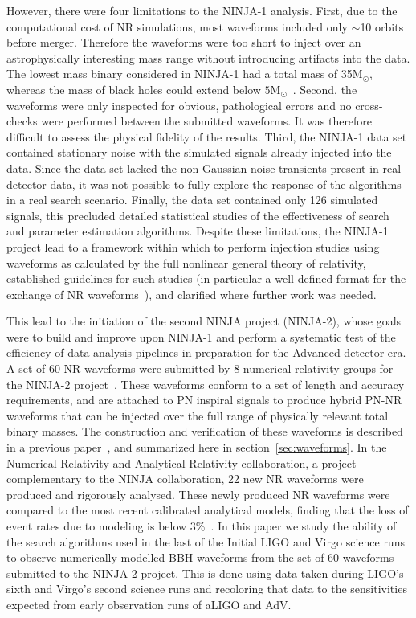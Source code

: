 \documentclass[12pt]{iopart}
\newcommand{\Ms}{\ensuremath{\mathrm{M}_{\odot}}}
\begin{document}
However, there were four limitations to
the NINJA-1 analysis. First, due to the computational cost of NR simulations, 
most waveforms 
included only $\sim$10 orbits before merger. Therefore the waveforms were 
too short to inject over an astrophysically
interesting mass range without introducing artifacts into the data. The lowest
mass binary considered in NINJA-1 had a total mass of 35$\Ms$, whereas
the mass of black holes could extend below
$5\Ms$~\cite{Farr:2010tu,Ozel:2010su}.
Second, the waveforms were only inspected for obvious,
pathological errors and no cross-checks were performed between the
submitted waveforms. It was therefore difficult to assess the
physical fidelity of the results.  
Third, the NINJA-1 data set
contained stationary noise with the simulated signals already injected
into the data. Since the data set lacked the non-Gaussian noise transients 
present 
in real detector data, it was not possible to fully explore the response of the
algorithms in a real search scenario. Finally, the data set contained only 126 
simulated signals,
this precluded detailed statistical studies of the effectiveness of
search and parameter estimation algorithms. Despite these limitations,
the NINJA-1 project lead to a framework within which to perform injection 
studies using waveforms as calculated by the full nonlinear general theory of 
relativity, established guidelines for such studies (in particular a 
well-defined format
for the exchange of NR waveforms~\cite{Brown:2007jx}), and clarified where 
further work was needed.

This lead to the initiation of the second NINJA project (NINJA-2), whose goals 
were to build and improve upon NINJA-1 and perform a systematic test of the 
efficiency of data-analysis pipelines in preparation for the Advanced detector 
era. A set of 60 NR waveforms were submitted by 8 numerical relativity groups 
for the NINJA-2 project~\cite{Ajith:2012az}. These waveforms conform 
to a set of length and accuracy requirements, and
are attached to PN inspiral signals to produce hybrid PN-NR waveforms that can 
be injected over the full range of physically relevant total binary masses.
The construction and verification of these waveforms is described in a previous 
paper~\cite{Ajith:2012az}, and summarized here in 
section~\ref{sec:waveforms}. In the Numerical-Relativity and 
Analytical-Relativity collaboration, a project complementary to the NINJA 
collaboration, 22 new NR waveforms were produced and rigorously analysed. These 
newly produced NR waveforms were compared to the most recent calibrated 
analytical models, finding that the loss of event rates due to modeling is 
below 3\%~\cite{Hinder:2013oqa}. In this paper we study the ability of the 
search algorithms used in
the last of the Initial LIGO and Virgo science runs to observe
numerically-modelled BBH waveforms from the set of 60 waveforms
submitted to the NINJA-2 project. This is done using data taken during LIGO's
sixth and Virgo's second science runs and recoloring that data to the
sensitivities expected from early observation runs of aLIGO and AdV.
\end{document}
